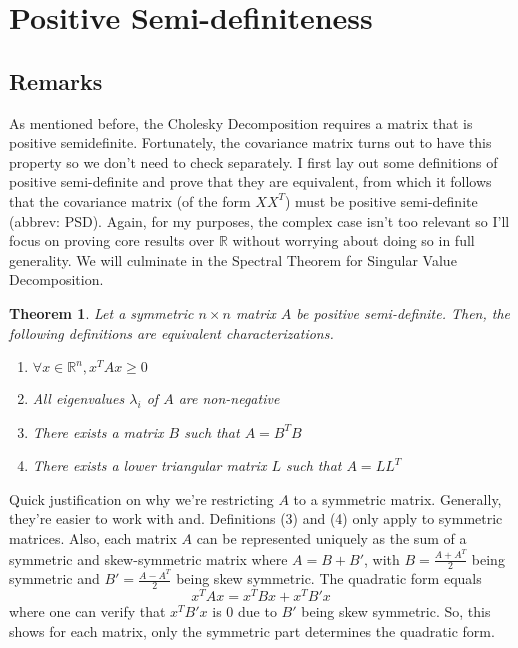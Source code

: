 \documentclass{article}
\newtheorem{theorem}{Theorem}[section]
\begin{document}
\section{Positive Semi-definiteness}
\subsection{Remarks}
As mentioned before, the Cholesky Decomposition requires a matrix that is positive semidefinite. Fortunately, the covariance matrix turns out to have this property so we don't need to check separately. I first lay out some definitions of positive semi-definite and prove that they are equivalent, from which it follows that the covariance matrix (of the form $XX^T$) must be positive semi-definite (abbrev: PSD). 
\newline
Again, for my purposes, the complex case isn't too relevant so I'll focus on proving core results over $\mathbb{R}$ without worrying about doing so in full generality. 
\noindent We will culminate in the Spectral Theorem for Singular Value Decomposition. 

\begin{theorem}
Let a symmetric $n \times n$ matrix $A$ be positive semi-definite. Then, the following definitions are equivalent characterizations. 
\begin{enumerate}
    \item $ \forall x \in \mathbb{R}^n, x^TAx \geq 0$
    \item All eigenvalues $\lambda_i$ of $A$ are non-negative
    \item There exists a matrix $B$ such that $A = B^TB$
    \item There exists a lower triangular matrix $L$ such that $A = LL^T$
\end{enumerate}
\end{theorem}

\noindent Quick justification on why we're restricting $A$ to a symmetric matrix. Generally, they're easier to work with and. Definitions (3) and (4) only apply to symmetric matrices. Also, each matrix $A$ can be represented uniquely as the sum of a symmetric and skew-symmetric matrix where $A = B + B'$, with $B = \frac{A+A^T}{2}$ being symmetric and $B' = \frac{A-A^T}{2}$ being skew symmetric. The quadratic form equals 
$$ x^TAx = x^TBx + x^TB'x$$
where one can verify that $x^TB'x$ is 0 due to $B'$ being skew symmetric. So, this shows for each matrix, only the symmetric part determines the quadratic form. 
\end{document}
